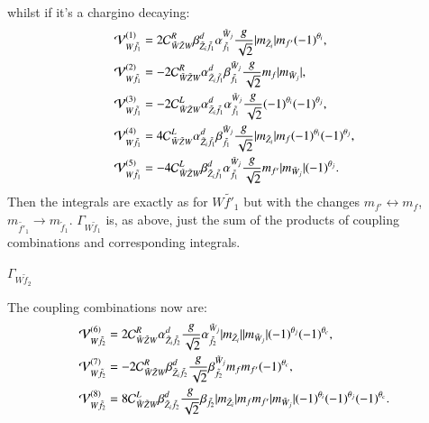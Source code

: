 \documentclass[final,3p,times]{elsarticle}
\begin{document}
whilst if it's a chargino decaying:
\begin{align}
\mathcal{V}_{W \tilde{f}_1}^{(1)} &= 2 \mathcal{C}_{\tilde{W} \tilde{Z} W}^R \beta_{\tilde{Z}_i \tilde{f}_1}^{d} \alpha_{\tilde{f}_1}^{\tilde{W}_j}{g \over \sqrt{2}} |m_{\tilde{Z}_i}| m_{f'}(-1)^{\theta_i}, \\
\mathcal{V}_{W \tilde{f}_1}^{(2)} &= -2 \mathcal{C}_{\tilde{W} \tilde{Z} W}^R \alpha_{\tilde{Z}_i \tilde{f}_1}^{d} \beta_{\tilde{f}_1}^{\tilde{W}_j}{g \over \sqrt{2}} m_{f} |m_{\tilde{W}_j}|, \\
\mathcal{V}_{W \tilde{f}_1}^{(3)} &= -2 \mathcal{C}_{\tilde{W} \tilde{Z} W}^L \alpha_{\tilde{Z}_i \tilde{f}_1}^{d} \alpha_{\tilde{f}_1}^{\tilde{W}_j}{g \over \sqrt{2}} (-1)^{\theta_i}(-1)^{\theta_j}, \\
\mathcal{V}_{W \tilde{f}_1}^{(4)} &= 4 \mathcal{C}_{\tilde{W} \tilde{Z} W}^L \alpha_{\tilde{Z}_i \tilde{f}_1}^{d} \beta_{\tilde{f}_1}^{\tilde{W}_j} {g \over \sqrt{2}} |m_{\tilde{Z}_i}|m_{f}(-1)^{\theta_i}(-1)^{\theta_j}, \\
\mathcal{V}_{W \tilde{f}_1}^{(5)} &= -4 \mathcal{C}_{\tilde{W} \tilde{Z} W}^L \beta_{\tilde{Z}_i \tilde{f}_1}^{d} \alpha_{\tilde{f}_1}^{\tilde{W}_j}{g \over \sqrt{2}}m_{f'}|m_{\tilde{W}_j}|(-1)^{\theta_j}.
\end{align}
Then the integrals are exactly as for $W \tilde{f'}_1$ but with the changes $m_{f'} \leftrightarrow m_{f}$, $m_{\tilde{f'}_1} \rightarrow m_{\tilde{f}_1}$. $\Gamma_{W \tilde{f}_1}$ is, as above, just the sum of the products of coupling combinations and corresponding integrals.

\textbf{\underline{$\Gamma_{W \tilde{f}_2}$}}

The coupling combinations now are:
\begin{align}
\mathcal{V}_{W \tilde{f}_2}^{(6)} &= 2 \mathcal{C}_{\tilde{W} \tilde{Z} W}^R \alpha_{\tilde{Z}_i \tilde{f}_2}^{d} {g \over \sqrt{2}} \alpha_{\tilde{f}_2}^{\tilde{W}_j} |m_{\tilde{Z}_i}||m_{\tilde{W}_j}|(-1)^{\theta_j}(-1)^{\theta_c}, \\
\mathcal{V}_{W \tilde{f}_2}^{(7)} &= -2 \mathcal{C}_{\tilde{W} \tilde{Z} W}^R \beta_{\tilde{Z}_i \tilde{f}_2}^{d} {g \over \sqrt{2}} \beta_{\tilde{f}_2}^{\tilde{W}_j}m_{f}m_{f'}(-1)^{\theta_c}, \\
\mathcal{V}_{W \tilde{f}_2}^{(8)} &= 8 \mathcal{C}_{\tilde{W} \tilde{Z} W}^L \beta_{\tilde{Z}_i \tilde{f}_2}^{d} {g \over \sqrt{2}} \beta_{\tilde{f}_2} |m_{\tilde{Z}_i}|m_{f}m_{f'}|m_{\tilde{W}_j}|(-1)^{\theta_i}(-1)^{\theta_j}(-1)^{\theta_c}.
\end{align}
\end{document}
